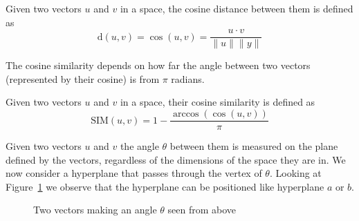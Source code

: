 \begin{definition}\label{def:cosineDistance}
    Given two vectors $u$ and $v$ in a space, the cosine distance between them is defined as
    \begin{equation}
        \text{d}(u,v)=\cos(u,v)=\frac{u\cdot v}{\|u\|\|y\|}
    \end{equation}
\end{definition}

The cosine similarity depends on how far the angle between two vectors (represented by their cosine) is from $\pi$ radians.

\begin{definition}\label{def:cosineSimilarity}
    Given two vectors $u$ and $v$ in a space, their cosine similarity is defined as
    \begin{equation}
        \text{SIM}(u,v)=1-\frac{\arccos\left(\cos(u,v)\right)}{\pi}
    \end{equation}
\end{definition}

Given two vectors $u$ and $v$ the angle $\theta$ between them is measured on the plane defined by the vectors, regardless of the dimensions of the space they are in. We now consider a hyperplane that passes through the vertex of $\theta$. Looking at Figure~\ref{fig:angleHyperplane} we observe that the hyperplane can be positioned like hyperplane $a$ or $b$.
\begin{figure}
    \centering
    \caption{Two vectors making an angle $\theta$ seen from above}
    \label{fig:angleHyperplane}
\end{figure}

